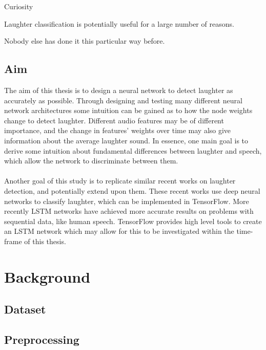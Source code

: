 \documentclass[a4paper,11pt,notitlepage]{article}
\begin{document}
Curiosity

Laughter classification is potentially useful for a large number of reasons.

Nobody else has done it this particular way before.

\subsection{Aim}


The aim of this thesis is to design a neural network to detect laughter as accurately as possible. Through designing and testing many different neural network architectures some intuition can be gained as to how the node weights change to detect laughter. Different audio features may be of different importance, and the change in features' weights over time may also give information about the average laughter sound. In essence, one main goal is to derive some intuition about fundamental differences between laughter and speech, which allow the network to discriminate between them.\\
\\
Another goal of this study is to replicate similar\cite{gosztolya2016laughter} recent works on laughter detection, and potentially extend upon them. These recent works use deep neural networks to classify laughter, which can be implemented in TensorFlow. More recently LSTM networks have achieved more accurate results on problems with sequential data, like human speech.\cite{hannun2014deep,mozilladeepspeech} TensorFlow provides high level tools to create an LSTM network which may allow for this to be investigated within the time-frame of this thesis.

\section{Background}


\subsection{Dataset}

\subsection{Preprocessing}
\end{document}
